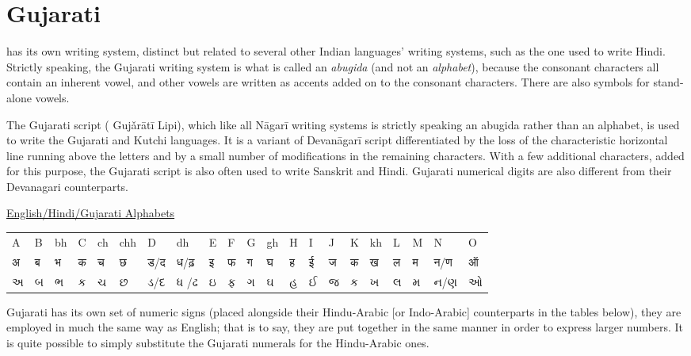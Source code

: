 \section{Gujarati}
\label{s:gujarati}
has its own writing system, distinct but related to several other Indian languages' writing systems, such as the one used to write Hindi. Strictly speaking, the Gujarati writing system is what is called an \emph{abugida} (and not an \textit{alphabet}), because the consonant characters all contain an inherent vowel, and other vowels are written as accents added on to the consonant characters. There are also symbols for stand-alone vowels.

The Gujarati script ({} Gujǎrātī Lipi), which like all Nāgarī writing systems is strictly speaking an abugida rather than an alphabet, is used to write the Gujarati and Kutchi languages. It is a variant of Devanāgarī script differentiated by the loss of the characteristic horizontal line running above the letters and by a small number of modifications in the remaining characters.
With a few additional characters, added for this purpose, the Gujarati script is also often used to write Sanskrit and Hindi.
Gujarati numerical digits are also different from their Devanagari counterparts.
\medskip

\bgroup
\newfontfamily{}
\gujarati

\centering

\underline{English/Hindi/Gujarati Alphabets}

\hskip-1.5cm\begin{tabular}{lllllllllllllllllllll}
A &B &bh &C &ch &chh &D &dh &E &F &G &gh &H &I &J &K &kh &L &M &N &O\\

अ &ब &भ &क &च &छ &ड/द &ध/ढ़ &इ &फ &ग &घ &ह &ई &ज &क &ख &ल &म &न/ण &ऑ\\

અ &બ &ભ &ક &ચ &છ &ડ/દ &ધ /ઢ &ઇ &ફ &ગ &ઘ &હ &ઈ &જ &ક &ખ &લ &મ &ન/ણ &ઓ\\

\end{tabular}
\egroup

\medskip

Gujarati has its own set of numeric signs (placed alongside their Hindu-Arabic [or Indo-Arabic] counterparts in the tables below), they are employed in much the same way as English;  that is to say, they are put together in the same manner in order to express larger numbers. It is quite possible to simply substitute the Gujarati numerals for the Hindu-Arabic ones.

